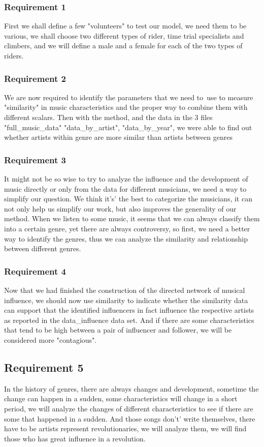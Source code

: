 \documentclass[12pt]{article}
\begin{document}
\subsubsection{Requirement 1}
First we shall define a few "volunteers" to test our model, we need them to be various, we shall choose two different types of rider, time trial
specialists and climbers, and we will define a male and a female for each of the two types of riders.
\subsubsection{Requirement 2}
We are now required to identify the parameters that we need to\
use to measure "similarity" in music
characteristics and the proper way to combine them with different scalars. Then with the method,
and the data in the 3 files "full\_music\_data"
"data\_by\_artist", "data\_by\_year",
we were able to find out whether  artists
within genre  are more similar  than artists between genres

\subsubsection{Requirement 3}
It might not be so wise to try to analyze the influence and the development of music directly or only from the data for different musicians, we need a way to simplify our question.
We think it's' the best to categorize the musicians, it can not only help us simplify our work, but also  improves the generality of our method.
When we listen to some music, it seems that we can always classify them into a certain genre, yet there are always controversy, so first, we need a better way to identify the genres, thus we can analyze
the similarity and relationship between different genres.
\subsubsection{Requirement 4}
Now that we had finished the construction of the directed network
of musical influence, we should now use similarity to indicate whether the similarity data can support
that the identified influencers in fact influence the respective
artists as reported in the data\_influence data set. And if there are some characteristics that tend to be high between a pair of influencer and follower, we will be
considered more "contagious".
\subsection{Requirement 5}
In the history of genres, there are always changes and development, sometime the change can happen in a sudden, some characteristics will change in a short period,
we will analyze the changes
of different characteristics to see if there are some that happened in a sudden. And those songs don't' write themselves,
there have to be artists represent revolutionaries, we will analyze them, we will find those who has great influence in a revolution.
\end{document}

